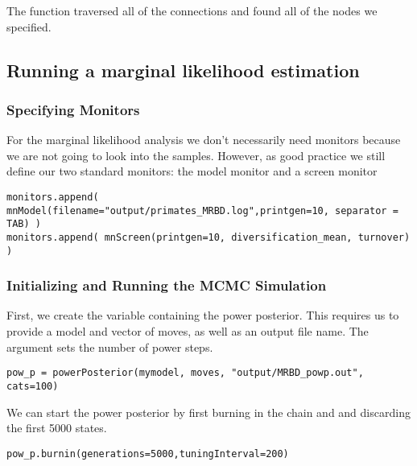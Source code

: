 The  function traversed all of the connections and found all of the nodes we specified.


\subsection{Running a marginal likelihood estimation}

\subsubsection{Specifying Monitors}

For the marginal likelihood analysis we don't necessarily need monitors because we are not going to look into the samples.
However, as good practice we still define our two standard monitors: the model monitor and a screen monitor
{\tt \begin{snugshade*}
\begin{lstlisting}
monitors.append( mnModel(filename="output/primates_MRBD.log",printgen=10, separator = TAB) )
monitors.append( mnScreen(printgen=10, diversification_mean, turnover) )
\end{lstlisting}
\end{snugshade*}}

\subsubsection{Initializing and Running the MCMC Simulation}



First, we create the variable containing the power posterior.
This requires us to provide a model and vector of moves, as well as an output file name.
The  argument sets the number of power steps.
{\tt \begin{snugshade*}
\begin{lstlisting}
pow_p = powerPosterior(mymodel, moves, "output/MRBD_powp.out", cats=100)
\end{lstlisting}
\end{snugshade*}}

We can start the power posterior by first burning in the chain and and discarding the first 5000 states.
{\tt \begin{snugshade*}
\begin{lstlisting}
pow_p.burnin(generations=5000,tuningInterval=200)
\end{lstlisting}
\end{snugshade*}}

